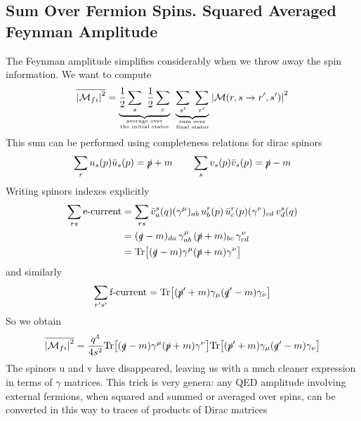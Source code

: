 \documentclass[TheoreticalPhy_ModB.tex]{subfiles}
\begin{document}
\subsection{Sum Over Fermion Spins. Squared Averaged Feynman Amplitude}
The Feynman amplitude simplifies considerably when we throw away the spin information. We want to compute
\[
\overline{\abs{\mathM_{fi}}^2} = \underbrace{\frac{1}{2} \sum_s \ \frac{1}{2} \sum_r}_{\textup{average over} \atop \text{the initial states}} \ 
	\underbrace{\sum_{s'} \ \sum_{r'}}_{\textup{sum over} \atop \text{final states}} \abs{\mathM(r,s \to r',s')}^2
\]
This sum can be performed using completeness relations for dirac spinors
\[
\sum_r u_s(p) \bar{u}_s(p) = \slashed p + m
\qquad
\sum_s v_s(p) \bar{v}_s(p) = \slashed p - m
\]
Writing spinors indexes explicitly 
\[
\begin{split}
\sum_{rs} \text{e-current}	& = \sum_{rs} \bar{v}^s_a(q) (\gamma^{\mu})_{ab} \, u^r_b(p) \, \bar{u}^r_c(p) (\gamma^{\nu})_{cd} \, v_d^s(q) \\
					& = (\slashed q - m)_{da} \, \gamma^{\mu}_{ab} \, (\slashed p + m)_{bc} \, \gamma_{cd}^{\nu} \\
					& = \textup{Tr} \bigl[ (\slashed q - m) \gamma^{\mu} (\slashed p + m) \gamma^{\nu} \bigr]
\end{split}
\]
and similarly
\[
\sum_{r's'} \text{f-current} = \textup{Tr} \bigl[ (\slashed p' + m) \gamma_{\mu} (\slashed q' - m)\gamma_{\nu} \bigr]
\]
So we obtain
\[
\overline{\left\lvert \mathcal{M}_{fi} \right\rvert^2} = \frac{q^4}{4s^2} \textup{Tr} \bigl[ (\slashed q - m) \gamma^{\mu} (\slashed p + m) \gamma^{\nu} \bigr]
	\textup{Tr} \bigl[ (\slashed p' + m) \gamma_{\mu} (\slashed q' -m) \gamma_{\nu} \bigr]
\]
The spinors u and v have disappeared, leaving us with a much cleaner expression in terms of $\gamma$ matrices. This trick is very genera: any QED amplitude involving external fermions, when squared and summed or averaged over spins, can be converted in this way to traces of products of Dirac matrices
\end{document}

